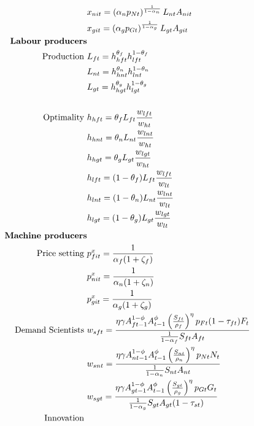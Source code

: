 \begin{align}
&x_{nit}= \left(\alpha_n p_{Nt}\right)^\frac{1}{1-\alpha_n}L_{nt}A_{nit}\\
&x_{git}= \left(\alpha_g p_{Gt}\right)^\frac{1}{1-\alpha_g}L_{gt}A_{git}
\\
\text{\textbf{Labour producers}}&
\\
\text{Production}\ \vspace{4mm}& L_{ft}=h_{hft}^{\theta_{f}}h_{lft}^{1-\theta_{f}}\\
& L_{nt}=h_{hnt}^{\theta_{n}}h_{lnt}^{1-\theta_{n}}\\
& L_{gt}=h_{hgt}^{\theta_{g}}h_{lgt}^{1-\theta_{g}}\\
\ \\
\text{Optimality}\ \vspace{4mm}& h_{hft}= \theta_{f}L_{ft}\frac{w_{lft}}{w_{ht}}\label{eq:opt_lab_pro}\\
& h_{hnt}= \theta_{n}L_{nt}\frac{w_{lnt}}{w_{ht}}\\
& h_{hgt}= \theta_{g}L_{gt}\frac{w_{lgt}}{w_{ht}}\\
& h_{lft}= (1-\theta_{f})L_{ft}\frac{w_{lft}}{w_{lt}}\label{eq:opt_lab_pro_low}\\
& h_{lnt}= (1-\theta_{n}) L_{nt}\frac{w_{lnt}}{w_{lt}}\\
& h_{lgt}= (1-\theta_{g}) L_{gt}\frac{w_{lgt}}{w_{lt}}\\
%
\text{\textbf{Machine producers}}\\
\text{Price setting}\ \vspace{4mm}&p_{fit}^x=\frac{1}{\alpha_f(1+\zeta_f)}\\
&p_{nit}^x=\frac{1}{\alpha_n(1+\zeta_n)}\\
&p_{git}^x=\frac{1}{\alpha_g(1+\zeta_g)}
\\ 
\text{Demand Scientists}\ \vspace{4mm}&
w_{sft}=\frac{\eta \gamma A_{ft-1}^{1-\phi}A_{t-1}^{\phi}\left(\frac{S_{ft}}{\rho_f}\right)^{\eta}p_{Ft}(1-\tau_{ft})F_t}{\frac{1}{1-\alpha_f}S_{ft}A_{ft}}\\
&
w_{snt}=\frac{\eta \gamma  A_{nt-1}^{1-\phi}A_{t-1}^{\phi}\left(\frac{S_{nt}}{\rho_n}\right)^{\eta}p_{Nt}N_t}{\frac{1}{1-\alpha_n}S_{nt}A_{nt}}\\
&
w_{sgt}=\frac{\eta \gamma  A_{gt-1}^{1-\phi}A_{t-1}^{\phi}\left(\frac{S_{gt}}{\rho_g}\right)^{\eta}p_{Gt}G_t}{\frac{1}{1-\alpha_g}S_{gt}A_{gt}(1-\tau_{st})}\\
\text{Innovation}\ \vspace{4mm}&

\end{align}
